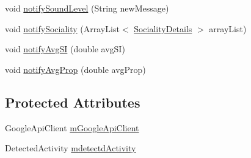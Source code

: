 \begin{DoxyCompactItemize}
\item 
void \hyperlink{classcs_1_1nsense_1_1_n_sense_service_a171fc46d4a450a4b261bfc6837d7fcd7}{notify\-Sound\-Level} (String new\-Message)
\item 
void \hyperlink{classcs_1_1nsense_1_1_n_sense_service_a1f84199e2059ec012f2c1d4fa399187c}{notify\-Sociality} (Array\-List$<$ \hyperlink{classcs_1_1nsense_1_1inference_module_1_1_sociality_details}{Sociality\-Details} $>$ array\-List)
\item 
void \hyperlink{classcs_1_1nsense_1_1_n_sense_service_a9736f1efe77924c4e646ad90bad20dda}{notify\-Avg\-S\-I} (double avg\-S\-I)
\item 
void \hyperlink{classcs_1_1nsense_1_1_n_sense_service_a8789203fe9bd2067b2f313a1a1575f6d}{notify\-Avg\-Prop} (double avg\-Prop)
\end{DoxyCompactItemize}
\subsection*{Protected Attributes}
\begin{DoxyCompactItemize}
\item 
Google\-Api\-Client \hyperlink{classcs_1_1nsense_1_1_n_sense_service_a8b5bcd278223c26fb1c2a898df43918a}{m\-Google\-Api\-Client}
\item 
Detected\-Activity \hyperlink{classcs_1_1nsense_1_1_n_sense_service_ac380c449787b843e6c419d2c372c5644}{mdetectd\-Activity}
\end{DoxyCompactItemize}
